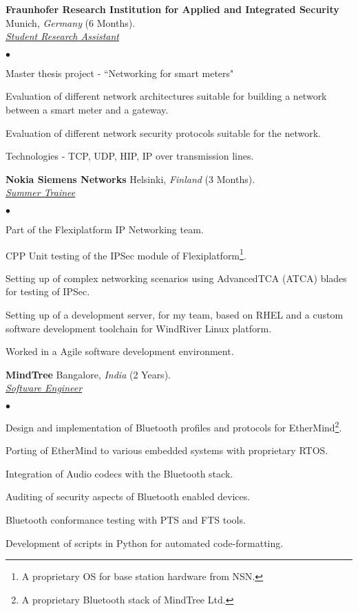 \documentclass[a4paper]{article}
\newcommand{\employer}[4]{{ \textbf{#1} #2  (#3).\\ \underline{\emph{#4}}\\  }}
\newenvironment{achievements}{\begin{list}{$\bullet$}{\topsep 0pt \itemsep -2pt}}{\vspace*{4pt}\end{list}}
\begin{document}
\break
\employer{Fraunhofer Research Institution for Applied and Integrated Security} {Munich, \textit{Germany}} {6 Months}{Student Research Assistant}
	\begin{achievements}
	  \item Master thesis project - ``Networking for smart meters"
	  \item Evaluation of different network architectures suitable for building a network between a smart meter and a gateway.
	  \item Evaluation of different network security protocols suitable for the network.
          \item Technologies - TCP, UDP, HIP, IP over transmission lines.
	\end{achievements}

\employer{Nokia Siemens Networks}{Helsinki, \textit{Finland}}{3 Months}{Summer Trainee}
	\begin{achievements}
          \item Part of the Flexiplatform IP Networking team.
	  \item CPP Unit testing of the IPSec module of Flexiplatform\footnote[1]{A proprietary OS for base station hardware from NSN.}.
	  \item Setting up of complex networking scenarios using AdvancedTCA (ATCA) blades for testing of IPSec.
	  \item Setting up of a development server, for my team, based on RHEL and a custom software development toolchain for WindRiver Linux platform.
	  \item Worked in a Agile software development environment.
	\end{achievements}

\employer{MindTree} {Bangalore, \textit{India}}{2 Years} {Software Engineer}
	\begin{achievements}
	\item Design and implementation of Bluetooth profiles and protocols for EtherMind\footnote[2]{A proprietary Bluetooth stack of MindTree Ltd.}.
	\item Porting of EtherMind to various embedded systems with proprietary RTOS.
	\item Integration of Audio codecs with the Bluetooth stack.
	\item Auditing of security aspects of Bluetooth enabled devices.
	\item Bluetooth conformance testing with PTS and FTS tools.
	\item Development of scripts in Python for automated code-formatting.
	\end{achievements}
\end{document}
